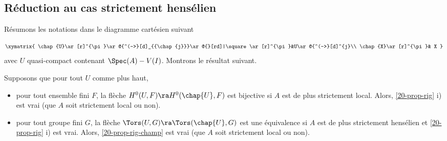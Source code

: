\documentclass[10pt]{../fichiers-configuration-latex/smfart}
\begin{document}
\subsection{Réduction au cas strictement hensélien} Résumons les notations dans le diagramme
cartésien suivant

$$\xymatrix{
\chap{U}\ar[r]^{\pi}\ar@{^(->}[d]_{{\chap{j}}}\ar@{}[rd]|\square\ar[r]^{\pi}&U\ar@{^(->}[d]^{j}\\
\chap{X}\ar[r]^{\pi}& X }$$ avec $U$ quasi-compact contenant $\Spec(A)-V(I)$.  Montrons le résultat
suivant.

\begin{proposition2}\label{20-reduchensel} Supposons que pour tout $U$ comme plus haut,
\begin{itemize} \item[i)] pour tout ensemble fini $F$, la flèche $H^0(U,F)\ra H^0(\chap{U} ,F)$ est
bijective si $A$ est de plus strictement local. Alors, \ref{20-prop-rig} i) est vrai (que $A$ soit
strictement local ou non).  \item[ii)]  pour tout groupe fini $G$, la flèche
$\Tors(U,G)\ra\Tors(\chap{U},G)$ est une équivalence si $A$ est de plus strictement hensélien et
\ref{20-prop-rig} i) est vrai. Alors, \ref{20-prop-rig-champ} est vrai (que $A$ soit strictement
local ou non).  \end{itemize} \end{proposition2}
\end{document}
